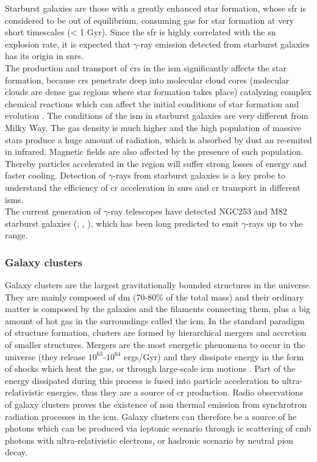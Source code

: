 \documentclass[main.tex]{subfiles}
\begin{document}
Starburst galaxies are those with a greatly enhanced star formation, whose \gls{sfr} is considered to be out of equilibrium, consuming gas for star formation at very short timescales (< 1 Gyr). Since the \gls{sfr} is highly correlated with the \gls{sn} explosion rate, it is expected that $\gamma$-ray emission detected from starburst galaxies has its origin in \glspl{snr}.\\
The production and transport of \glspl{cr} in the \gls{ism} significantly affects the star formation, because \glspl{cr} penetrate deep into molecular cloud cores (molecular clouds are dense gas regions where star formation takes place) catalyzing complex chemical reactions which can affect the initial conditions of star formation and evolution \cite{2016starburst}. The conditions of the \gls{ism} in starburst galaxies are very different from Milky Way. The gas density is much higher and the high population of massive stars produce a huge amount of radiation, which is absorbed by dust an re-emited in infrared. Magnetic fields are also affected by the presence of such population. Thereby particles accelerated in the region will suffer strong losses of energy and faster cooling. Detection of $\gamma$-rays from starburst galaxies is a key probe to understand the efficiency of \gls{cr} acceleration in \glspl{snr} and \gls{cr} transport in different \glspl{ism}.  \\
The current generation of $\gamma$-ray telescopes have detected NGC253 and M82 starburst galaxies (\cite{2009starbursthess}, \cite{2009starburstveritas}, \cite{2010starburstFermi}), which has been long predicted to emit $\gamma$-rays up to \gls{vhe} range.\\

\subsubsection{Galaxy clusters} \label{sec:clusters}

Galaxy clusters are the largest gravitationally bounded structures in the universe. They are mainly composed of \gls{dm} (70-80\% of the total mass) and their ordinary matter is composed by the galaxies and the filaments connecting them, plus a big amount of hot gas in the surroundings called the \gls{icm}. In the standard paradigm of structure formation, clusters are formed by hierarchical mergers and accretion of smaller structures. Mergers are the most energetic phenomena to occur in the universe (they release $10^{63}$-$10^{64}$ ergs/Gyr) and they dissipate energy in the form of shocks which heat the gas, or through large-scale \gls{icm} motions \cite{2014CRinClusters}. Part of the energy dissipated during this process is fused into particle acceleration to ultra-relativistic energies, thus they are a source of \gls{cr} production. Radio observations of galaxy clusters proves the existence of non thermal emission from synchrotron radiation processes in the \gls{icm}. Galaxy clusters can therefore be a source of \gls{he} photons which can be produced via leptonic scenario through \gls{ic} scattering of \gls{cmb} photons with ultra-relativistic electrons, or hadronic scenario by neutral pion decay.\\
\end{document}
